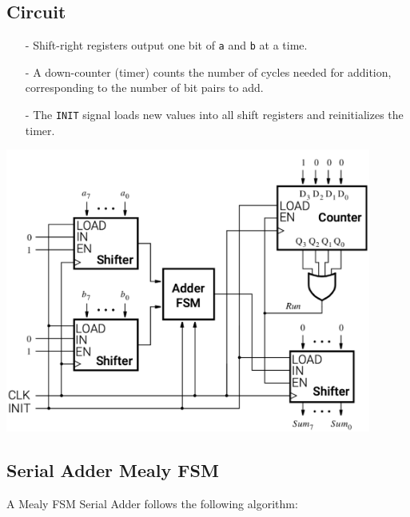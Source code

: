 \documentclass[12pt,openany]{book}
\begin{document}
\subsection{Circuit}
\begin{minipage}[htp]{0.45\textwidth}
	\begin{itemize}
		\item[-] Shift-right registers output one bit of \texttt{a} and \texttt{b} at a time.
		\item[-] A down-counter (timer) counts the number of cycles needed for addition, corresponding to the number of bit pairs to add.
		\item[-] The \texttt{INIT} signal loads new values into all shift registers and reinitializes the timer.
	\end{itemize}
\end{minipage}
\hfill
\vline
\hfill
\begin{minipage}[htp]{0.45\textwidth}
	\begin{center}
		\includegraphics[width=0.9\textwidth]{circuits/18.3.1.png}
	\end{center}
\end{minipage}
\subsection{Serial Adder Mealy FSM}
A Mealy FSM Serial Adder follows the following algorithm:
\end{document}
